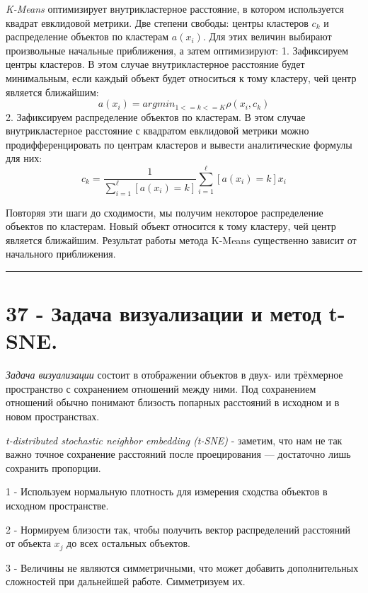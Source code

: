 \documentclass[11pt]{article}
\begin{document}
\emph{K-Means} оптимизирует внутрикластерное расстояние, в котором
используется квадрат евклидовой метрики. Две степени свободы: центры
кластеров \(c_k\) и распределение объектов по кластерам \(a(x_i)\). Для
этих величин выбирают произвольные начальные приближения, а затем
оптимизируют: 1. Зафиксируем центры кластеров. В этом случае
внутрикластерное расстояние будет минимальным, если каждый объект будет
относиться к тому кластеру, чей центр является ближайшим:
\[a(x_i) = arg min_{1<=k<=K}ρ(x_i, c_k)\] 2. Зафиксируем распределение
объектов по кластерам. В этом случае внутрикластерное расстояние с
квадратом евклидовой метрики можно продифференцировать по центрам
кластеров и вывести аналитические формулы для них:
\[c_k = \frac{1}{\sum_{i=1}^ℓ[a(x_i) = k]} \sum_{i=1}^ℓ[a(x_i) = k]x_i\]

Повторяя эти шаги до сходимости, мы получим некоторое распределение
объектов по кластерам. Новый объект относится к тому кластеру, чей центр
является ближайшим. Результат работы метода K-Means существенно зависит
от начального приближения.

    \begin{center}\rule{0.5\linewidth}{\linethickness}\end{center}

    \section{37 - Задача визуализации и метод
t-SNE.}\label{ux437ux430ux434ux430ux447ux430-ux432ux438ux437ux443ux430ux43bux438ux437ux430ux446ux438ux438-ux438-ux43cux435ux442ux43eux434-t-sne.}

\emph{Задача визуализации} состоит в отображении объектов в двух- или
трёхмерное пространство с сохранением отношений между ними. Под
сохранением отношений обычно понимают близость попарных расстояний в
исходном и в новом пространствах.

\emph{t-distributed stochastic neighbor embedding (t-SNE)} - заметим,
что нам не так важно точное сохранение расстояний после проецирования
--- достаточно лишь сохранить пропорции.

1 - Используем нормальную плотность для измерения сходства объектов в
исходном пространстве.

2 - Нормируем близости так, чтобы получить вектор распределений
расстояний от объекта \(x_j\) до всех остальных объектов.

3 - Величины не являются симметричными, что может добавить
дополнительных сложностей при дальнейшей работе. Симметризуем их.
\end{document}
